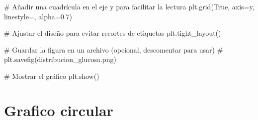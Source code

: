 \documentclass[
  jou,
  floatsintext,
  longtable,
  a4paper,
  nolmodern,
  notxfonts,
  notimes,
  colorlinks=true,linkcolor=blue,citecolor=blue,urlcolor=blue]{apa7}
\newenvironment{Shaded}{\begin{snugshade}}{\end{snugshade}}
\newcommand{\CommentTok}[1]{\textcolor[rgb]{0.37,0.37,0.37}{#1}}
\newcommand{\FloatTok}[1]{\textcolor[rgb]{0.68,0.00,0.00}{#1}}
\newcommand{\NormalTok}[1]{\textcolor[rgb]{0.00,0.23,0.31}{#1}}
\newcommand{\OperatorTok}[1]{\textcolor[rgb]{0.37,0.37,0.37}{#1}}
\newcommand{\StringTok}[1]{\textcolor[rgb]{0.13,0.47,0.30}{#1}}
\newcommand{\VariableTok}[1]{\textcolor[rgb]{0.07,0.07,0.07}{#1}}
\begin{document}
\begin{Shaded}
\begin{Highlighting}[]
\CommentTok{\# Añadir una cuadrícula en el eje y para facilitar la lectura}
\NormalTok{plt.grid(}\VariableTok{True}\NormalTok{, axis}\OperatorTok{=}\StringTok{\textquotesingle{}y\textquotesingle{}}\NormalTok{, linestyle}\OperatorTok{=}\StringTok{\textquotesingle{}{-}{-}\textquotesingle{}}\NormalTok{, alpha}\OperatorTok{=}\FloatTok{0.7}\NormalTok{)}

\CommentTok{\# Ajustar el diseño para evitar recortes de etiquetas}
\NormalTok{plt.tight\_layout()}

\CommentTok{\# Guardar la figura en un archivo (opcional, descomentar para usar)}
\CommentTok{\# plt.savefig(\textquotesingle{}distribucion\_glucosa.png\textquotesingle{})}

\CommentTok{\# Mostrar el gráfico}
\NormalTok{plt.show()}
\end{Highlighting}
\end{Shaded}

\section{Grafico circular}\label{grafico-circular}
\end{document}
